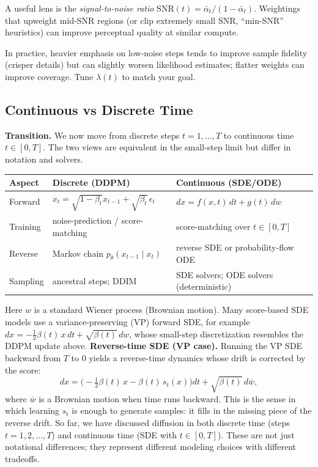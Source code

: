 A useful lens is the \emph{signal-to-noise ratio} $\mathrm{SNR}(t)=\bar{\alpha}_t/(1-\bar{\alpha}_t)$. Weightings that upweight mid-SNR regions (or clip extremely small SNR, ``min-SNR'' heuristics) can improve perceptual quality at similar compute.

In practice, heavier emphasis on low-noise steps tends to improve sample fidelity (crisper details) but can slightly worsen likelihood estimates; flatter weights can improve coverage. Tune $\lambda(t)$ to match your goal.

\subsection{Continuous vs Discrete Time}


\vspPara
\textbf{Transition.} We now move from discrete steps $t=1,\dots,T$ to continuous time $t\in[0,T]$. The two views are equivalent in the small-step limit but differ in notation and solvers.

\begin{center}
\begin{tabular}{l|l|l}
\textbf{Aspect} & \textbf{Discrete (DDPM)} & \textbf{Continuous (SDE/ODE)} \\
\hline
Forward & $x_t=\sqrt{1-\beta_t}x_{t-1}+\sqrt{\beta_t}\,\epsilon_t$ & $dx= f(x,t)\,dt + g(t)\,dw$ \\
Training & noise-prediction / score-matching & score-matching over $t\in[0,T]$ \\
Reverse & Markov chain $p_\theta(x_{t-1}\mid x_t)$ & reverse SDE or probability-flow ODE \\
Sampling & ancestral steps; DDIM & SDE solvers; ODE solvers (deterministic) \\
\end{tabular}
\end{center}
Here $w$ is a standard Wiener process (Brownian motion). Many score-based SDE models use a variance-preserving (VP) forward SDE, for example $dx=-\tfrac{1}{2}\beta(t)\,x\,dt+\sqrt{\beta(t)}\,dw$, whose small-step discretization resembles the DDPM update above.
\vspPara
\textbf{Reverse-time SDE (VP case).} Running the VP SDE backward from $T$ to $0$ yields a reverse-time dynamics whose drift is corrected by the score:
$$dx=\Big(-\tfrac{1}{2}\beta(t)\,x-\beta(t)\,s_t(x)\Big)dt+\sqrt{\beta(t)}\,d\bar{w},$$
where $\bar{w}$ is a Brownian motion when time runs backward. This is the sense in which learning $s_t$ is enough to generate samples: it fills in the missing piece of the reverse drift.
So far, we have discussed diffusion in both discrete time (steps $t = 1, 2, \ldots, T$) and continuous time (SDE with $t \in [0,T]$). These are not just notational differences; they represent different modeling choices with different tradeoffs.

